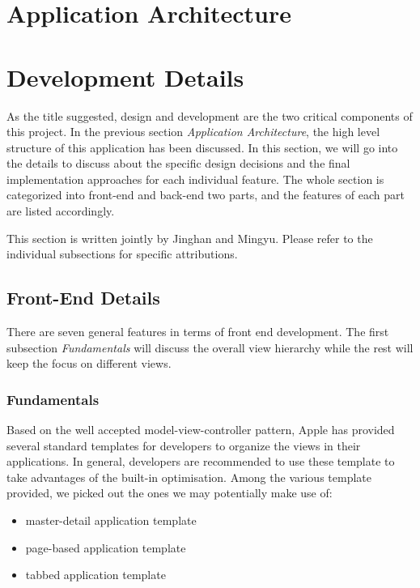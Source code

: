 \documentclass[12pt,a4paper]{article}
\begin{document}
    
    \section{Application Architecture} %
    \clearpage
    
    \section{Development Details}
    
    As the title suggested, design and development are the two critical components of this project. In the previous section \textit{Application Architecture}, the high level structure of this application has been discussed. In this section, we will go into the details to discuss about the specific design decisions and the final implementation approaches for each individual feature. The whole section is categorized into front-end and back-end two parts, and the features of each part are listed accordingly. 
    
    \footnotesize
    This section is written jointly by Jinghan and Mingyu. Please refer to the individual subsections for specific attributions.
    \normalsize
            
        \subsection{Front-End Details}
        There are seven general features in terms of front end development. The first subsection \textit{Fundamentals} will discuss the overall view hierarchy while the rest will keep the focus on different views.
            
            \subsubsection{Fundamentals} %
            \label{fe:fundamentals}
            Based on the well accepted model-view-controller pattern, Apple has provided several standard templates for developers to organize the views in their applications. In general, developers are recommended to use these template to take advantages of the built-in optimisation. Among the various template provided, we picked out the ones we may potentially make use of:
            \begin{itemize}
            \setlength\itemsep{-0.5em}
            \item master-detail application template
            \item page-based application template
            \item tabbed application template
            \end{itemize}
            
\end{document}
